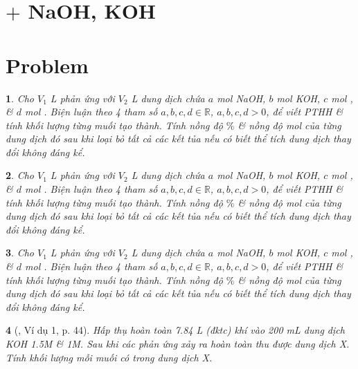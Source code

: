 \documentclass{article}
\newtheorem{baitoan}{}
\begin{document}
\section{ $+$ NaOH, KOH}


\section{Problem}

\begin{baitoan}
	Cho $V_1$ {\rm L}  phản ứng với $V_2$ {\rm L} dung dịch chứa $a$ mol {\rm NaOH}, $b$ mol {\rm KOH}, $c$ mol {\rm{}}, \& $d$ mol {\rm{}}. Biện luận theo 4 tham số $a,b,c,d\in\mathbb{R}$, $a,b,c,d > 0$, để viết {\rm PTHH} \& tính khối lượng từng muối tạo thành. Tính nồng độ $\%$ \& nồng độ mol của từng dung dịch đó sau khi loại bỏ tất cả các kết tủa nếu có biết thể tích dung dịch thay đổi không đáng kể.
\end{baitoan}

\begin{baitoan}
	Cho $V_1$ {\rm L}  phản ứng với $V_2$ {\rm L} dung dịch chứa $a$ mol {\rm NaOH}, $b$ mol {\rm KOH}, $c$ mol {\rm{}}, \& $d$ mol {\rm{}}. Biện luận theo 4 tham số $a,b,c,d\in\mathbb{R}$, $a,b,c,d > 0$, để viết {\rm PTHH} \& tính khối lượng từng muối tạo thành. Tính nồng độ $\%$ \& nồng độ mol của từng dung dịch đó sau khi loại bỏ tất cả các kết tủa nếu có biết thể tích dung dịch thay đổi không đáng kể.
\end{baitoan}

\begin{baitoan}
	Cho $V_1$ {\rm L}  phản ứng với $V_2$ {\rm L} dung dịch chứa $a$ mol {\rm NaOH}, $b$ mol {\rm KOH}, $c$ mol {\rm{}}, \& $d$ mol {\rm{}}. Biện luận theo 4 tham số $a,b,c,d\in\mathbb{R}$, $a,b,c,d > 0$, để viết {\rm PTHH} \& tính khối lượng từng muối tạo thành. Tính nồng độ $\%$ \& nồng độ mol của từng dung dịch đó sau khi loại bỏ tất cả các kết tủa nếu có biết thể tích dung dịch thay đổi không đáng kể.
\end{baitoan}

\begin{baitoan}[\cite{Truong_Long_Huong_bdhsg_Hoa_Hoc_9}, Ví dụ 1, p. 44]
	Hấp thụ hoàn toàn {\rm7.84 L} (đktc) khí {\rm{}} vào {\rm200 mL} dung dịch {\rm KOH 1.5M} \& {\rm{} 1M}. Sau khi các phản ứng xảy ra hoàn toàn thu được dung dịch X. Tính khối lượng mỗi muối có trong dung dịch X.
\end{baitoan}
\end{document}
